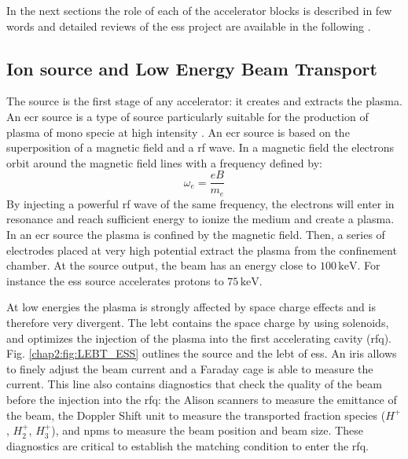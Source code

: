 \begin{refsection}
  

  In the next sections the role of each of the accelerator blocks is described in few words and detailed reviews of the \acrshort{ess} project are available in the following \cite{Peggs2013, Garoby2017}.

  \subsection{Ion source and Low Energy Beam Transport}
  The source is the first stage of any accelerator: it creates and extracts the plasma. An \acrfull{ecr} source is a type of source particularly suitable for the production of plasma of mono specie at high intensity \cite{nicke2012}. An \acrshort{ecr} source is based on the superposition of a magnetic field and a \acrshort{rf} wave. In a magnetic field the electrons orbit around the magnetic field lines with a frequency defined by:
  \begin{equation}
    \omega_{e} = \frac{eB}{m_{e}}
  \end{equation}
  By injecting a powerful \acrshort{rf} wave of the same frequency, the electrons will enter in resonance and reach sufficient energy to ionize the medium and create a plasma. In an \acrshort{ecr} source the plasma is confined by the magnetic field. Then, a series of electrodes placed at very high potential extract the plasma from the confinement chamber. At the source output, the beam has an energy close to $100\,\mathrm{keV}$. For instance the \acrshort{ess} source accelerates
  protons to $75\,\mathrm{keV}$.
  

  At low energies the plasma is strongly affected by space charge effects and is therefore very divergent. The \acrfull{lebt} contains the space charge by using solenoids, and optimizes the injection of the plasma into the first accelerating cavity (\acrshort{rfq}).
  Fig. \ref{chap2:fig:LEBT_ESS} outlines the source and the \acrshort{lebt} of \acrshort{ess}. An iris allows to finely adjust the beam current and a Faraday cage is able to measure the current. This line also contains diagnostics that check the quality of the beam before the injection into the \acrshort{rfq}: the Alison scanners to measure the emittance of the beam, the Doppler Shift unit to measure the transported fraction species ($H^{+}$, $H_{2}^{+}$, $H_{3}^{+}$), and \acrshort{npm}s to measure the beam position and beam size. These diagnostics are critical to establish the matching condition to enter the \acrshort{rfq}.


\end{refsection}
